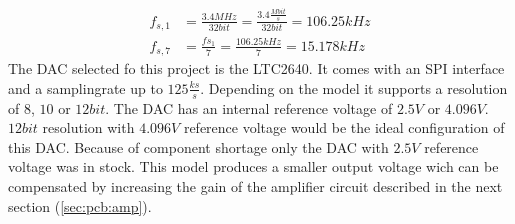 %
\begin{align}
  f_{s,1} &= \frac{3.4MHz}{32bit} = \frac{3.4 \frac{Mbit}{s}}{32bit} = 106.25kHz \label{eq:pcb:fs}\\[1em]
  f_{s, 7} &= \frac{fs_1}{7} = \frac{106.25kHz}{7} = 15.178kHz
\end{align}
%
The DAC selected fo this project is the LTC2640. It comes with an SPI interface and a samplingrate up to $125\frac{ks}{s}$. Depending on the model it supports a resolution of $8$, $10$ or $12bit$. The DAC has an internal reference voltage of $2.5V$ or $4.096V$. $12bit$ resolution with $4.096V$ reference voltage would be the ideal configuration of this DAC. Because of component shortage only the DAC with $2.5V$ reference voltage was in stock. This model produces a smaller output voltage wich can be compensated by increasing the gain of the amplifier circuit described in the next section (\ref{sec:pcb:amp}).